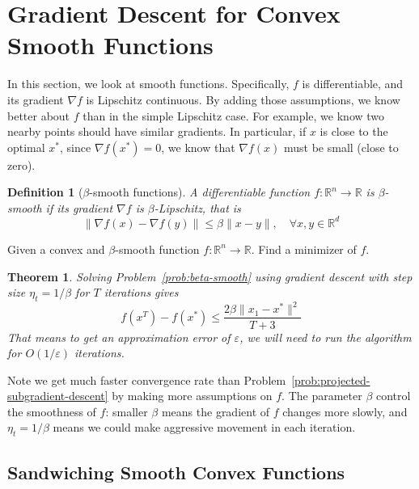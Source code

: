 \documentclass{scrartcl}
\newtheorem{theorem}{Theorem}
\newtheorem{definition}{Definition}
\newcommand{\RR}{\mathbb{R}}
\begin{document}
\section{Gradient Descent for Convex Smooth Functions}

In this section, we look at smooth functions. Specifically, $f$ is differentiable, and its gradient
$\nabla f$ is Lipschitz continuous. By adding those assumptions, we know better about $f$ than in
the simple Lipschitz case. For example, we know two nearby points should have similar gradients.
In particular, if $x$ is close to the optimal $x^*$, since $\nabla f(x^*)=0$, we know that $\nabla
f(x)$ must be small (close to zero).

\begin{definition}[$\beta$-smooth functions]
A differentiable function $f:\RR^n\rightarrow \RR$ is $\beta$-smooth if its gradient $\nabla f$ is
$\beta$-Lipschitz, that is
\begin{equation}
  \|\nabla f(x)-\nabla f(y)\| \leq \beta \|x-y\|,\quad \forall x,y\in\RR^d
\end{equation}
\end{definition}

\begin{problem}
  Given a convex and $\beta$-smooth function $f:\RR^n\rightarrow\RR$. Find a minimizer of $f$.
  \label{prob:beta-smooth}
\end{problem}

\begin{theorem}
  Solving Problem~\ref{prob:beta-smooth} using gradient descent with step size $\eta_t=1/\beta$ for
  $T$ iterations gives
  \begin{equation}
    f(x^T)-f(x^*) \leq \frac{2\beta \|x_1-x^*\|^2}{T+3}
  \end{equation}
  That means to get an approximation error of $\varepsilon$, we will need to run the algorithm for
  $O(1/\varepsilon)$ iterations.
  \label{thm:beta-smooth}
\end{theorem}
Note we get much faster convergence rate than Problem~\ref{prob:projected-subgradient-descent} by
making more assumptions on $f$. The parameter $\beta$ control the smoothness of $f$: smaller $\beta$
means the gradient of $f$ changes more slowly, and $\eta_t=1/\beta$ means we could make aggressive
movement in each iteration.

\subsection{Sandwiching Smooth Convex Functions}
\end{document}
